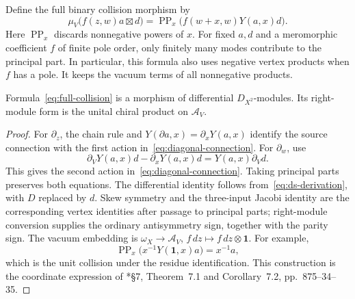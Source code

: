 Define the full binary collision morphism by
\begin{equation}\label{eq:full-collision}
 \mu_V\bigl(f(z,w)a\boxtimes d\bigr)
 =\operatorname{PP}_x\bigl(f(w+x,w)Y(a,x)d\bigr).
\end{equation}
Here $\operatorname{PP}_x$ discards nonnegative powers of $x$.
For fixed $a,d$ and a meromorphic coefficient $f$ of finite pole order, only finitely many modes contribute to the principal part.
In particular, this formula also uses negative vertex products when $f$ has a pole.
It keeps the vacuum terms of all nonnegative products.

\begin{lemma}\label{lem:collision-chain}
Formula~\eqref{eq:full-collision} is a morphism of differential $D_{X^2}$-modules.
Its right-module form is the unital chiral product on $\mathcal A_V$.
\end{lemma}
\begin{proof}
For $\partial_z$, the chain rule and $Y(\partial a,x)=\partial_xY(a,x)$ identify the source connection with the first action in~\eqref{eq:diagonal-connection}.
For $\partial_w$, use
\[
 \partial_VY(a,x)d-\partial_xY(a,x)d=Y(a,x)\partial_Vd.
\]
This gives the second action in~\eqref{eq:diagonal-connection}.
Taking principal parts preserves both equations.
The differential identity follows from~\eqref{eq:ds-derivation}, with $D$ replaced by $d$.
Skew symmetry and the three-input Jacobi identity are the corresponding vertex identities after passage to principal parts; right-module conversion supplies the ordinary antisymmetry sign, together with the parity sign.
The vacuum embedding is
$\omega_X\to\mathcal A_V$, $f\,dz\mapsto f\,dz\otimes\mathbf1$.
For example,
\[
 \operatorname{PP}_x\bigl(x^{-1}Y(\mathbf1,x)a\bigr)=x^{-1}a,
\]
which is the unit collision under the residue identification.
This construction is the coordinate expression of \cite{AffineDSFrenkel026}*{\S7, Theorem~7.1 and Corollary~7.2, pp.~875--34--35}.
\end{proof}

